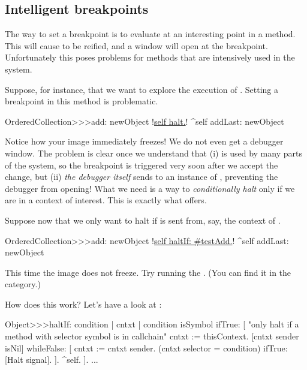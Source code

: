 \documentclass[a4paper,10pt,twoside]{book}
\begin{document}
\subsection{Intelligent breakpoints}

The \st way to set a breakpoint is to evaluate  at an interesting point in a method.  This will cause  to be reified, and a  window will open at the breakpoint.
Unfortunately this poses problems for methods that are intensively used in the system.

Suppose, for instance, that we want to explore the execution of .
Setting a breakpoint in this method is problematic.

\begin{code}{}
OrderedCollection>>>add: newObject
	!\underline{self halt.}!
	^self addLast: newObject
\end{code}

Notice how your image immediately freezes!  We do not even get a debugger window.
The problem is clear once we understand that (i)  is used by many parts of the system, so the breakpoint is triggered very soon after we accept the change, but (ii) \emph{the debugger itself} sends  to an instance of , preventing the debugger from opening!
What we need is a way to \emph{conditionally halt} only if we are in a context of interest.
This is exactly what  offers.

Suppose now that we only want to halt if  is sent from, say, the context of .

\begin{code}{}
OrderedCollection>>>add: newObject
	!\underline{self haltIf: \#testAdd.}!
	^self addLast: newObject
\end{code}

This time the image does not freeze. Try running the .
(You can find it in the  category.)

How does this work?  Let's have a look at :
\begin{code}{}
Object>>>haltIf: condition
	| cntxt |
	condition isSymbol ifTrue: [
		"only halt if a method with selector symbol is in callchain"
		cntxt := thisContext.
		[cntxt sender isNil] whileFalse: [
			cntxt := cntxt sender. 
			(cntxt selector = condition) ifTrue: [Halt signal]. ].
		^self.
	].
	...
\end{code}
\end{document}
